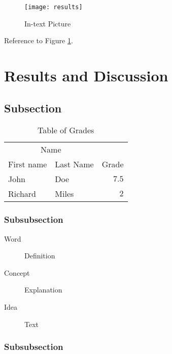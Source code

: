 \documentclass[fleqn,10pt]{SelfArx} %
\begin{document}
\lipsum[9] %

\begin{figure}[ht]\centering
\texttt{[image: results]}
\caption{In-text Picture}
\label{fig:results}
\end{figure}

Reference to Figure \ref{fig:results}.


\section{Results and Discussion}

\lipsum[10] %

\subsection{Subsection}

\lipsum[11] %

\begin{table}[hbt]
\caption{Table of Grades}
\centering
\begin{tabular}{llr}
\toprule
\multicolumn{2}{c}{Name} \\
\cmidrule(r){1-2}
First name & Last Name & Grade \\
\midrule
John & Doe & $7.5$ \\
Richard & Miles & $2$ \\
\bottomrule
\end{tabular}
\label{tab:label}
\end{table}

\subsubsection{Subsubsection}

\lipsum[12] %

\begin{description}
\item[Word] Definition
\item[Concept] Explanation
\item[Idea] Text
\end{description}

\subsubsection{Subsubsection}

\lipsum[13] %
\end{document}
